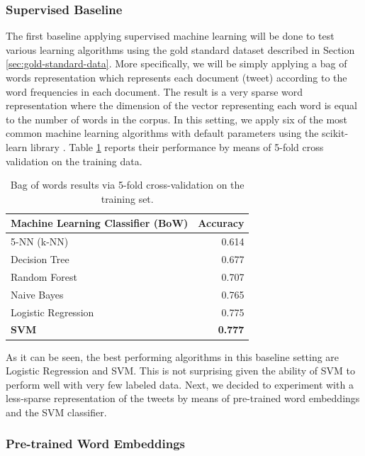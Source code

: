 \documentclass[information,article,submit,moreauthors,pdftex,10pt,a4paper]{Definitions/mdpi}
\begin{document}
\subsubsection{Supervised Baseline}\label{sec:sparse-word-repr}

The first baseline applying supervised machine learning will be done to test various learning algorithms using the gold standard dataset described in Section \ref{sec:gold-standard-data}. More specifically, we will be simply applying a bag of words representation which represents each document (tweet) according to the word frequencies in each document. The result is a very sparse word representation where the dimension of the vector representing each word is equal to the number of words in the corpus. In this setting, we apply six of the most common machine learning algorithms with default parameters using the scikit-learn library \cite{pedregosa2011scikit}. Table \ref{tab:acc-ml} reports their performance by means of 5-fold cross validation on the training data.

\begin{table}[H]
  \centering
  \begin{tabular}{lr} \hline
    Machine Learning Classifier (BoW) & Accuracy \\ \hline \hline
    5-NN (k-NN) &  0.614 \\
    Decision Tree &  0.677 \\
    Random Forest &  0.707 \\
    Naive Bayes & 0.765 \\
    Logistic Regression & 0.775 \\
    \textbf{SVM} & \textbf{0.777} \\ \hline
  \end{tabular}
  \caption{Bag of words results via 5-fold cross-validation on the training set.}
  \label{tab:acc-ml}
\end{table}

As it can be seen, the best performing algorithms in this baseline setting are Logistic Regression and SVM. This is not surprising given the ability of SVM to perform well with very few labeled data. Next, we decided to experiment with a less-sparse representation of the tweets by means of pre-trained word embeddings and the SVM classifier.

\subsubsection{Pre-trained Word Embeddings}\label{sec:pre-trained-word}
\end{document}
